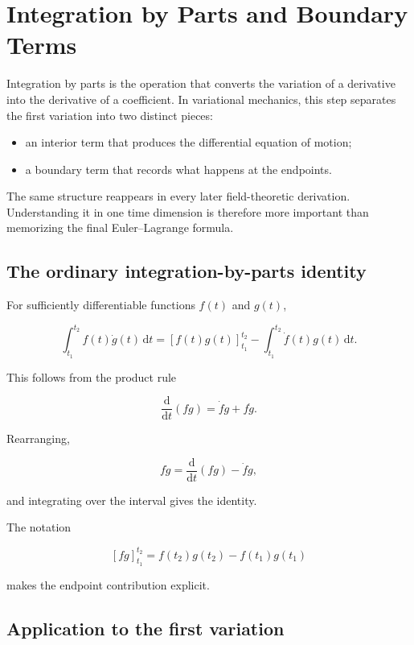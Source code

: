 \section{Integration by Parts and Boundary Terms}
\label{sec:integration_by_parts_boundary_terms}

Integration by parts is the operation that converts the variation of a derivative into the derivative of a coefficient. In variational mechanics, this step separates the first variation into two distinct pieces:

\begin{itemize}
    \item an interior term that produces the differential equation of motion;
    \item a boundary term that records what happens at the endpoints.
\end{itemize}

The same structure reappears in every later field-theoretic derivation. Understanding it in one time dimension is therefore more important than memorizing the final Euler--Lagrange formula.

\subsection{The ordinary integration-by-parts identity}

For sufficiently differentiable functions \(f(t)\) and \(g(t)\),

\[
\int_{t_{1}}^{t_{2}}
f(t)\dot g(t)
\,\mathrm{d}t
=
\left[f(t)g(t)\right]_{t_{1}}^{t_{2}}
-
\int_{t_{1}}^{t_{2}}
\dot f(t)g(t)
\,\mathrm{d}t.
\]

This follows from the product rule

\[
\frac{\mathrm{d}}{\mathrm{d}t}(fg)
=
\dot f g+f\dot g.
\]

Rearranging,

\[
f\dot g
=
\frac{\mathrm{d}}{\mathrm{d}t}(fg)-\dot f g,
\]

and integrating over the interval gives the identity.

The notation

\[
[fg]_{t_{1}}^{t_{2}}
=
f(t_{2})g(t_{2})-f(t_{1})g(t_{1})
\]

makes the endpoint contribution explicit.

\subsection{Application to the first variation}

